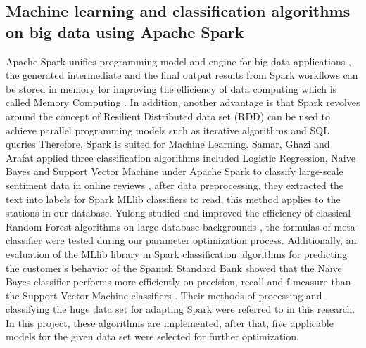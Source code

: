 \documentclass[conference]{IEEEtran}
\begin{document}
\subsection{Machine learning and classification algorithms on big data using Apache Spark}
Apache Spark unifies programming model and engine for big data applications \cite{b7}, the generated intermediate and the final output results from Spark workflows can be stored in memory for improving the efficiency of data computing which is called Memory Computing \cite{b8}. In addition, another advantage is that Spark revolves around the concept of Resilient Distributed data set (RDD) can be used to achieve parallel programming models such as iterative algorithms and SQL queries Therefore, Spark is suited for Machine Learning. Samar, Ghazi and Arafat applied three classification algorithms included Logistic Regression, Naive Bayes and Support Vector Machine under Apache Spark to classify large-scale sentiment data in online reviews \cite{b9}, after data preprocessing, they extracted the text into labels for Spark MLlib classifiers to read, this method applies to the stations in our database. Yulong studied and improved the efficiency of classical Random Forest algorithms on large database backgrounds \cite{b10}, the formulas of meta-classifier were tested during our parameter optimization process. Additionally, an evaluation of the MLlib library in Spark classification algorithms for predicting the customer’s behavior of the Spanish Standard Bank showed that the Naïve Bayes classifier performs more efficiently on precision, recall and f-measure than the Support Vector Machine classifiers \cite{b11}. Their methods of processing and classifying the huge data set for adapting Spark were referred to in this research. In this project, these algorithms are implemented, after that, five applicable models for the given data set were selected for further optimization.
\end{document}
